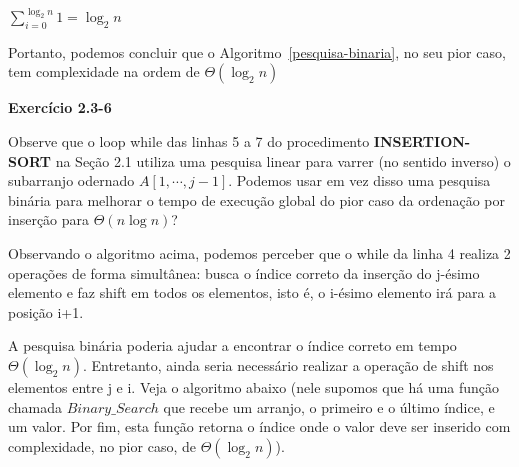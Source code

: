 \documentclass{article}
\begin{document}
    $\sum_{i=0}^{\log_2 n} 1 = \log_2 n$ 
    
    Portanto, podemos concluir que o Algoritmo~\ref{pesquisa-binaria}, no seu pior caso, tem complexidade na ordem de $\Theta(\log_2 n)$  

    \textbf{Exercício 2.3-6}

    Observe que o loop while das linhas 5 a 7 do procedimento \textbf{INSERTION-SORT} na Seção 2.1 utiliza uma pesquisa linear para varrer (no sentido inverso) o subarranjo odernado $A[1, \cdots, j-1]$. Podemos usar em vez disso uma pesquisa binária para melhorar o tempo de execução global do pior caso da ordenação por inserção para $\Theta(n \log n)$?


    \begin{algorithm}[H]
        \caption{INSERTION-SORT}
        \KwOut{}

    \end{algorithm}

    Observando o algoritmo acima, podemos perceber que o while da linha 4 realiza 2 operações de forma simultânea: busca o índice correto da inserção do j-ésimo elemento e faz shift em todos os elementos, isto é, o i-ésimo elemento irá para a posição i+1.

    A pesquisa binária poderia ajudar a encontrar o índice correto em tempo $\Theta(\log_2 n)$. Entretanto, ainda seria necessário realizar a operação de shift nos elementos entre j e i. Veja o algoritmo abaixo (nele supomos que há uma função chamada $Binary\_Search$ que recebe um arranjo, o primeiro e o último índice, e um valor. Por fim, esta função retorna o índice onde o valor deve ser inserido com complexidade, no pior caso, de $\Theta(\log_2 n)$).
    
    \begin{algorithm}[H]
        \caption{INSERTION-SORT-With-Binary-Search}
        \KwOut{}

    \end{algorithm}
\end{document}
